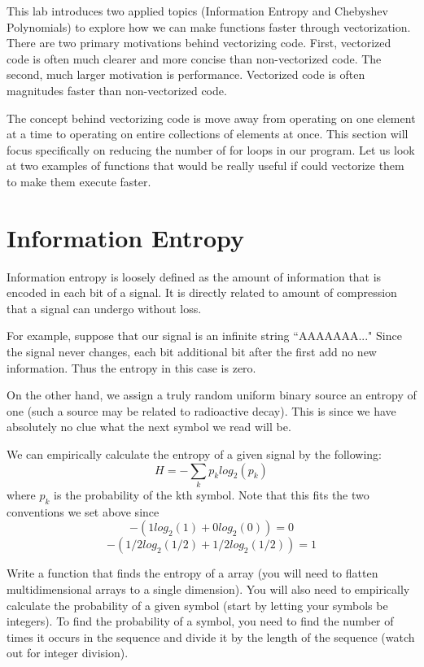 

This lab introduces two applied topics (Information Entropy and Chebyshev Polynomials) to explore how we can make functions faster through vectorization.  There are two primary motivations behind vectorizing code.  First, vectorized code is often much clearer and more concise than non-vectorized code.  The second, much larger motivation is performance.  Vectorized code is often magnitudes faster than non-vectorized code.  

The concept behind vectorizing code is move away from operating on one element at a time to operating on entire collections of elements at once.  This section will focus specifically on reducing the number of for loops in our program.  Let us look at two examples of functions that would be really useful if could vectorize them to make them execute faster.

\section*{Information Entropy}

Information entropy is loosely defined as the amount of information that is encoded in each bit of a signal. It is directly related to amount of compression that a signal can undergo without loss.

For example, suppose that our signal is an infinite string ``AAAAAAA..." Since the signal never changes, each bit additional bit after the first add no new information. Thus the entropy in this case is zero.

On the other hand, we assign a truly random uniform binary source an entropy of one (such a source may be related to radioactive decay). This is since we have absolutely no clue what the next symbol we read will be.

We can empirically calculate the entropy of a given signal by the following:
\[
H = -\sum_k{p_k log_2(p_k)}
\]
where $p_k$ is the probability of the kth symbol. Note that this fits the two conventions we set above since
\[
-(1log_2(1) + 0 log_2(0)) = 0
\]
\[
-(1/2log_2(1/2) + 1/2log_2(1/2)) = 1
\]

\begin{problem}
Write a function that finds the entropy of a array (you will need to flatten multidimensional arrays to a single dimension). You will also need to empirically calculate the probability of a given symbol (start by letting your symbols be integers). To find the probability of a symbol, you need to find the number of times it occurs in the sequence and divide it by the length of the sequence (watch out for integer division).
\end{problem}

